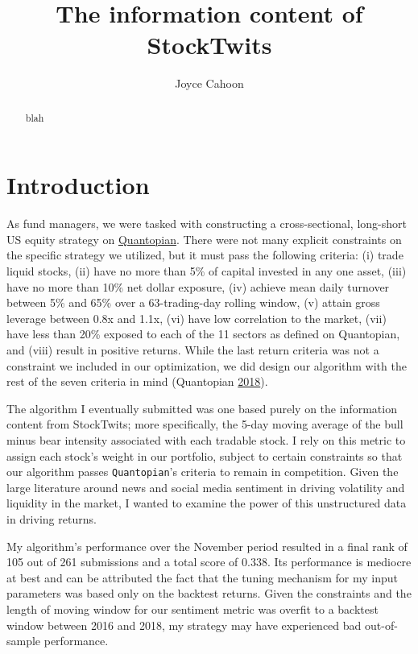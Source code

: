 \documentclass[11,]{article}
\title{The information content of StockTwits}
\author{Joyce Cahoon}
\date{}
\begin{document}
\maketitle
\begin{abstract}
blah
\end{abstract}

{
\setcounter{tocdepth}{2}
\tableofcontents
}
\newpage

\hypertarget{introduction}{%
\section{Introduction}\label{introduction}}

As fund managers, we were tasked with constructing a cross-sectional,
long-short US equity strategy on
\href{https://www.quantopian.com/}{Quantopian}. There were not many
explicit constraints on the specific strategy we utilized, but it must
pass the following criteria: (i) trade liquid stocks, (ii) have no more
than 5\% of capital invested in any one asset, (iii) have no more than
10\% net dollar exposure, (iv) achieve mean daily turnover between 5\%
and 65\% over a 63-trading-day rolling window, (v) attain gross leverage
between 0.8x and 1.1x, (vi) have low correlation to the market, (vii)
have less than 20\% exposed to each of the 11 sectors as defined on
Quantopian, and (viii) result in positive returns. While the last return
criteria was not a constraint we included in our optimization, we did
design our algorithm with the rest of the seven criteria in mind
(Quantopian \protect\hyperlink{ref-q}{2018}).

The algorithm I eventually submitted was one based purely on the
information content from StockTwits; more specifically, the 5-day moving
average of the bull minus bear intensity associated with each tradable
stock. I rely on this metric to assign each stock's weight in our
portfolio, subject to certain constraints so that our algorithm passes
\texttt{Quantopian}'s criteria to remain in competition. Given the large
literature around news and social media sentiment in driving volatility
and liquidity in the market, I wanted to examine the power of this
unstructured data in driving returns.

My algorithm's performance over the November period resulted in a final
rank of 105 out of 261 submissions and a total score of 0.338. Its
performance is mediocre at best and can be attributed the fact that the
tuning mechanism for my input parameters was based only on the backtest
returns. Given the constraints and the length of moving window for our
sentiment metric was overfit to a backtest window between 2016 and 2018,
my strategy may have experienced bad out-of-sample performance.
\end{document}
